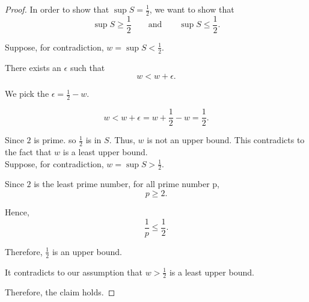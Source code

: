 \begin{proof}
   In order to show that $\sup S = \frac{1}{2}$, we want to show that 
   \begin{equation*}
        \sup S \geq \frac{1}{2} \qquad \text{and} \qquad \sup S \leq \frac{1}{2}. 
   \end{equation*}

   Suppose, for contradiction, $w = \sup S < \frac{1}{2}$. 
   
   There exists an $\epsilon$ such that 
   \begin{equation*}
        w < w + \epsilon. 
   \end{equation*}

   We pick the $\epsilon = \frac{1}{2} - w$.
   
   \begin{equation*}
        w < w + \epsilon = w + \frac{1}{2} - w = \frac{1 }{2}. 
   \end{equation*}
   
   Since $2$ is prime. so $\frac{1}{2}$ is in $S$. Thus,  $w$ is not an upper bound. This contradicts to the fact that $w$ is a least upper bound. \\

   Suppose, for contradiction, $w = \sup S > \frac{1}{2}. $

   Since $2$ is the least prime number, for all prime number p, 
   \begin{equation*}
        p \geq 2. 
   \end{equation*}

   Hence, 
   \begin{equation*}
    \frac{1}{p} \leq \frac{1}{2}. 
   \end{equation*}

   Therefore, $\frac{1}{2}$ is an upper bound. 

   It contradicts to our assumption that $w > \frac{1}{2}$ is a least upper bound. 

   Therefore, the claim holds. 
\end{proof}
